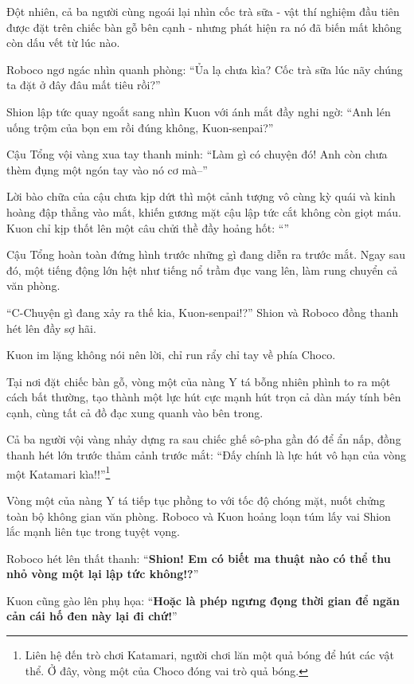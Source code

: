 \documentclass[../main.tex]{subfiles}
\begin{document}
Đột nhiên, cả ba người cùng ngoái lại nhìn cốc trà sữa - vật thí nghiệm đầu tiên được đặt trên chiếc bàn gỗ bên cạnh - nhưng phát hiện ra nó đã biến mất không còn dấu vết từ lúc nào.

Roboco ngơ ngác nhìn quanh phòng:
``Ủa lạ chưa kìa? Cốc trà sữa lúc nãy chúng ta đặt ở đây đâu mất tiêu rồi?''

Shion lập tức quay ngoắt sang nhìn Kuon với ánh mắt đầy nghi ngờ:
``Anh lén uống trộm của bọn em rồi đúng không, Kuon-senpai?''

Cậu Tổng vội vàng xua tay thanh minh:
``Làm gì có chuyện đó! Anh còn chưa thèm đụng một ngón tay vào nó cơ mà--''

Lời bào chữa của cậu chưa kịp dứt thì một cảnh tượng vô cùng kỳ quái và kinh hoàng đập thẳng vào mắt, khiến gương mặt cậu lập tức cắt không còn giọt máu. Kuon chỉ kịp thốt lên một câu chửi thề đầy hoảng hốt:
``''

Cậu Tổng hoàn toàn đứng hình trước những gì đang diễn ra trước mắt. Ngay sau đó, một tiếng động lớn hệt như tiếng nổ trầm đục vang lên, làm rung chuyển cả văn phòng.

``C-Chuyện gì đang xảy ra thế kia, Kuon-senpai!?'' Shion và Roboco đồng thanh hét lên đầy sợ hãi.

Kuon im lặng không nói nên lời, chỉ run rẩy chỉ tay về phía Choco.


Tại nơi đặt chiếc bàn gỗ, vòng một của nàng Y tá bỗng nhiên phình to ra một cách bất thường, tạo thành một lực hút cực mạnh hút trọn cả dàn máy tính bên cạnh, cùng tất cả đồ đạc xung quanh vào bên trong.

Cả ba người vội vàng nhảy dựng ra sau chiếc ghế sô-pha gần đó để ẩn nấp, đồng thanh hét lớn trước thảm cảnh trước mắt:
``Đấy chính là lực hút vô hạn của vòng một Katamari kìa!!''\footnote{Liên hệ đến trò chơi Katamari, người chơi lăn một quả bóng để hút các vật thể. Ở đây, vòng một của Choco đóng vai trò quả bóng.}

Vòng một của nàng Y tá tiếp tục phồng to với tốc độ chóng mặt, nuốt chửng toàn bộ không gian văn phòng. Roboco và Kuon hoảng loạn túm lấy vai Shion lắc mạnh liên tục trong tuyệt vọng.

Roboco hét lên thất thanh:
``\textbf{Shion! Em có biết ma thuật nào có thể thu nhỏ vòng một lại lập tức không!?}''

Kuon cũng gào lên phụ họa:
``\textbf{Hoặc là phép ngưng đọng thời gian để ngăn cản cái hố đen này lại đi chứ!}''
\end{document}
